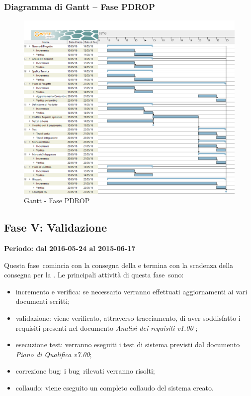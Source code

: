 \documentclass[../PianoProgetto.tex]{subfiles}
\begin{document}
		\subsubsection{Diagramma di Gantt – Fase PDROP}
			\begin{figure}[!h]
				\centering
				\includegraphics[width=\textwidth]{gantt_png/6-requisiti_facoltativi}
				\caption{Gantt - Fase PDROP}
				\label{fig:Gantt - Fase PDROP}
			\end{figure}
			
\newpage
	\subsection{Fase V: Validazione}
		\textbf{Periodo: dal 2016-05-24 al 2015-06-17}
		
		Questa fase\g\ comincia con la consegna della \revisionediqualifica e termina con la scadenza della consegna per la \revisionediaccettazione . Le principali attività di questa fase\g\ sono:

		\begin{itemize}
				\item incremento e verifica: se necessario verranno effettuati aggiornamenti ai vari documenti scritti;

				\item validazione: viene verificato, attraverso tracciamento, di aver soddisfatto i requisiti presenti nel documento \textit{Analisi dei requisiti v1.00} ;

				\item esecuzione test: verranno eseguiti i test di sistema previsti dal documento \textit{Piano di Qualifica v7.00};

				\item correzione bug\g : i bug\g\ rilevati verranno risolti;

				\item collaudo: viene eseguito un completo collaudo del sistema creato.
		\end{itemize}
		
\end{document}
